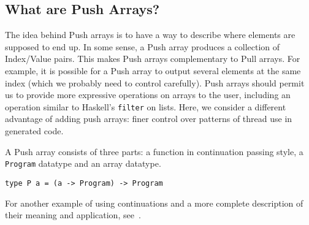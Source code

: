 




\subsection {What are Push Arrays?} 

The idea behind Push arrays is to have a way to describe where 
elements are supposed to end up. In some sense, a Push array produces 
a collection of Index/Value pairs. %
This makes Push arrays complementary to Pull arrays. For example, it 
is possible for a Push array to output several elements at the same index 
(which we probably need to control carefully). Push arrays should permit 
us to provide more expressive operations on arrays to the user, including 
an operation similar to Haskell's {\tt filter} on lists. Here, we consider 
a different advantage of adding push arrays: finer control over patterns of 
thread use in generated code.



A Push array consists of three parts: a function in continuation passing style, 
a {\tt Program} datatype and an array datatype. 

\begin{codesize}
\begin{verbatim}
type P a = (a -> Program) -> Program 
\end{verbatim}
\end{codesize}

\noindent
For another example of using continuations and a more complete
description of their meaning and application, see~\cite{POORKOEN}. 

